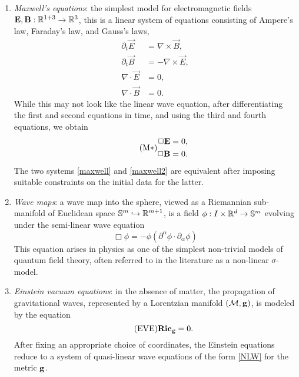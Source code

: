 \begin{example}
	\leavevmode
\begin{enumerate}
	\item \emph{Maxwell's equations}: the simplest model for electromagnetic fields $\mathbf E, \mathbf B: \mathbb R^{1 + 3} \to \mathbb R^3$, this is a linear system of equations consisting of Ampere's law, Faraday's law, and Gauss's laws,
		\begin{equation}\label{eq:maxwell}\tag{M}
			\begin{split}
				\partial_t \vec E 
					&= \nabla \times \vec B, \\
				\partial_t \vec B 
					&= - \nabla \times \vec E, \\
				\nabla \cdot \vec E
					&= 0,\\
				\nabla \cdot \vec B 
					&= 0. 
			\end{split}
		\end{equation}
	While this may not look like the linear wave equation, after differentiating the first and second equations in time, and using the third and fourth equations, we obtain 
		\begin{align}\label{eq:maxwell2}\tag{M$*$}
			\begin{split}
			\Box {\bf E}
				&= 0,\\
			\Box {\bf B} 
				&= 0.
			\end{split}
		\end{align}
	The two systems \eqref{maxwell} and \eqref{maxwell2} are equivalent after imposing suitable constraints on the initial data for the latter. 

	\item \emph{Wave maps}: a wave map into the sphere, viewed as a Riemannian sub-manifold of Euclidean space $\mathbb S^m \hookrightarrow \mathbb R^{m + 1}$, is a field $\phi: I \times \mathbb R^d \to \mathbb S^m$ evolving under the semi-linear wave equation
		\begin{equation}\tag{WM}\label{eq:wavemaps}
			\Box \phi 
				= - \phi ( \partial^\alpha \phi \cdot \partial_\alpha \phi)
		\end{equation}
	This equation arises in physics as one of the simplest non-trivial models of quantum field theory, often referred to in the literature as a non-linear $\sigma$-model. 
		
	
	\item \emph{Einstein vacuum equations}: in the absence of matter, the propagation of gravitational waves, represented by a Lorentzian manifold $(\mathcal M, {\bf g})$, is modeled by the equation
		\begin{equation}\tag{EVE}\label{eq:einstein}
			\mathbf{Ric}_{{\bf g}} = 0. 
		\end{equation}
	After fixing an appropriate choice of coordinates, the Einstein equations reduce to a system of quasi-linear wave equations of the form \eqref{NLW} for the metric ${\bf g}$. 

\end{enumerate}
\end{example}

